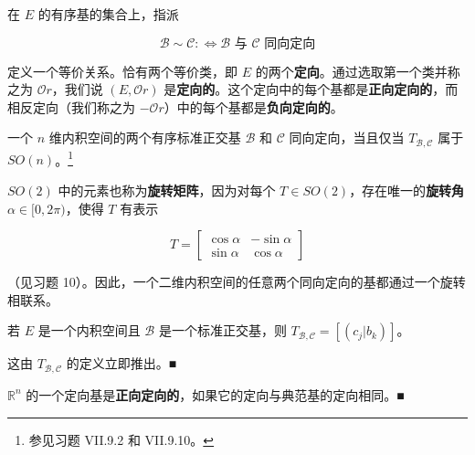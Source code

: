 \begin{remark}

\begin{items}
\item

在 $ E $ 的有序基的集合上，指派

\[
\mathcal{B} \sim \mathcal{C} :\Longleftrightarrow \mathcal{B} \text{ 与 } \mathcal{C} \text{ 同向定向}
\]

定义一个等价关系。恰有两个等价类，即 $ E $ 的两个\textbf{定向}。通过选取第一个类并称之为 $ \mathcal{O}r $，我们说 $ (E, \mathcal{O}r) $ 是\textbf{定向的}。这个定向中的每个基都是\textbf{正向定向的}，而相反定向（我们称之为 $ -\mathcal{O}r $）中的每个基都是\textbf{负向定向的}。

\item

一个 $ n $ 维内积空间的两个有序标准正交基 $ \mathcal{B} $ 和 $ \mathcal{C} $ 同向定向，当且仅当 $ T_{\mathcal{B},\mathcal{C}} $ 属于 $ SO(n) $。\footnote{参见习题 VII.9.2 和 VII.9.10。}

\item

$ SO(2) $ 中的元素也称为\textbf{旋转矩阵}，因为对每个 $ T \in SO(2) $，存在唯一的\textbf{旋转角} $ \alpha \in [0, 2\pi) $，使得 $ T $ 有表示

\begin{equation*}
T = \begin{bmatrix} \cos\alpha & -\sin\alpha \\ \sin\alpha & \cos\alpha \end{bmatrix}
\end{equation*}

（见习题 10）。因此，一个二维内积空间的任意两个同向定向的基都通过一个旋转相联系。

\item

若 $ E $ 是一个内积空间且 $ \mathcal{B} $ 是一个标准正交基，则 $ T_{\mathcal{B},\mathcal{C}} = [(c_j|b_k)] $。

\proofhead
这由 $ T_{\mathcal{B},\mathcal{C}} $ 的定义立即推出。\nobreak\hspace{0.35em}■
\item

$ \mathbb{R}^n $ 的一个定向基是\textbf{正向定向的}，如果它的定向与典范基的定向相同。\nobreak\hspace{0.35em}■

\end{items}

\end{remark}

